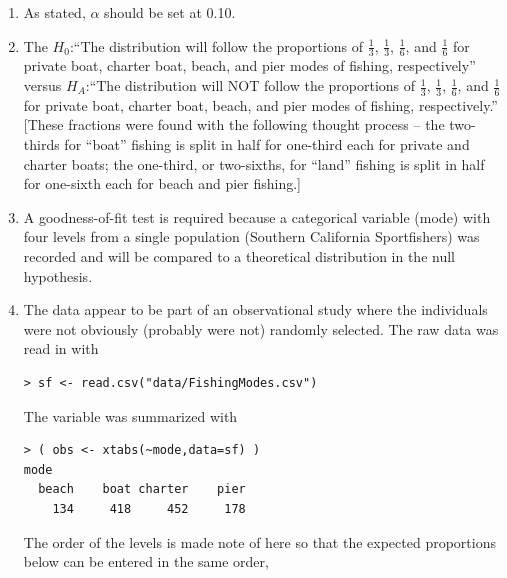 \documentclass[10pt,openany]{book}\usepackage[]{graphicx}\usepackage[]{color}
\makeatletter
\newenvironment{kframe}{%
 \def\at@end@of@kframe{}%
 \ifinner\ifhmode%
  \def\at@end@of@kframe{\end{minipage}}%
  \begin{minipage}{\columnwidth}%
 \fi\fi%
 \def\FrameCommand##1{\hskip\@totalleftmargin \hskip-\fboxsep
 \colorbox{shadecolor}{##1}\hskip-\fboxsep
     \hskip-\linewidth \hskip-\@totalleftmargin \hskip\columnwidth}%
 \MakeFramed {\advance\hsize-\width
   \@totalleftmargin\z@ \linewidth\hsize
   \@setminipage}}%
 {\par\unskip\endMakeFramed%
 \at@end@of@kframe}
\newenvironment{knitrout}{}{} %
\makeatother
\begin{document}
\begin{enumerate}
  \item As stated, $\alpha$ should be set at 0.10.
  \item The  $H_{0}$:``The distribution will follow the proportions of $\frac{1}{3}$, $\frac{1}{3}$, $\frac{1}{6}$, and $\frac{1}{6}$ for private boat, charter boat, beach, and pier modes of fishing, respectively'' versus $H_{A}$:``The distribution will NOT follow the proportions of $\frac{1}{3}$, $\frac{1}{3}$, $\frac{1}{6}$, and $\frac{1}{6}$ for private boat, charter boat, beach, and pier modes of fishing, respectively.''  [These fractions were found with the following thought process -- the two-thirds for ``boat'' fishing is split in half for one-third each for private and charter boats; the one-third, or two-sixths, for ``land'' fishing is split in half for one-sixth each for beach and pier fishing.]
  \item A goodness-of-fit test is required because a categorical variable (mode) with four levels from a single population (Southern California Sportfishers) was recorded and will be compared to a theoretical distribution in the null hypothesis.
  \item The data appear to be part of an observational study where the individuals were not obviously (probably were not) randomly selected.  The raw data was read in with
\begin{knitrout}
\color{fgcolor}\begin{kframe}
\begin{verbatim}
> sf <- read.csv("data/FishingModes.csv")
\end{verbatim}
\end{kframe}
\end{knitrout}
The  variable was summarized with
\begin{knitrout}
\color{fgcolor}\begin{kframe}
\begin{verbatim}
> ( obs <- xtabs(~mode,data=sf) )
mode
  beach    boat charter    pier 
    134     418     452     178 
\end{verbatim}
\end{kframe}
\end{knitrout}
The order of the levels is made note of here so that the expected proportions below can be entered in the same order,
\begin{knitrout}
\color{fgcolor}\begin{kframe}

\end{kframe}
\end{knitrout}
\end{enumerate}
\end{document}
